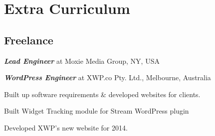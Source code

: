 \documentclass[]{deedy-resume-openfont}
\begin{document}
\begin{minipage}[t]{0.33\textwidth}

\section{Extra Curriculum}
\subsection{Freelance}
\vspace{\topsep} %
\begin{tightemize}
\item \textbf{\textit{Lead Engineer}} at Moxie Media Group, NY, USA
\item \textbf{\textit{WordPress Engineer}} at XWP.co Pty. Ltd., Melbourne, Australia
\item Built up software requirements \& developed websites for clients.
\item Built Widget Tracking module for Stream WordPress plugin
\item Developed XWP’s new website for 2014.
\end{tightemize}
\sectionsep

%
%

\end{minipage} 
\hfill
\end{document}
